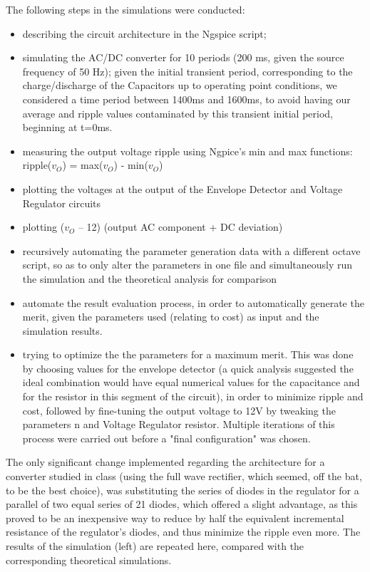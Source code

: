 The following steps in the simulations were conducted: 
\begin{itemize}
	\item describing the circuit architecture in the Ngspice script;
	\item simulating the AC/DC converter for 10 periods (200 ms, given the source frequency of 50 Hz); given the initial transient period, corresponding to the charge/discharge of the Capacitors up to operating point conditions, we considered a time period between 1400ms and 1600ms, to avoid having our average and ripple values contaminated by this transient initial period, beginning at t=0ms.
	\item measuring the output voltage ripple using Ngpice’s min and
max functions: ripple($v_O$) = max($v_O$) - min($v_O$)
	\item plotting the voltages at the output of the Envelope Detector
and Voltage Regulator circuits
	\item plotting ($v_O$ – 12) (output AC component + DC deviation)
	\item recursively automating the parameter generation data with a different octave script, so as to only alter the parameters in one file and simultaneously run the simulation and the theoretical analysis for comparison
	\item automate the result evaluation process, in order to automatically generate the merit, given the parameters used (relating to cost) as input and the simulation results.
	\item trying to optimize the the parameters for a maximum merit. This was done by choosing values for the envelope detector (a quick analysis suggested the ideal combination would have equal numerical values for the capacitance and for the resistor in this segment of the circuit), in order to minimize ripple and cost, followed by fine-tuning the output voltage to 12V by tweaking the parameters n and Voltage Regulator resistor. Multiple iterations of this process were carried out before a "final configuration" was chosen.
	

\end{itemize}

The only significant change implemented regarding the architecture for a converter studied in class (using the full wave rectifier, which seemed, off the bat, to be the best choice), was substituting the series of diodes in the regulator for a parallel of two equal series of 21 diodes, which offered a slight advantage, as this proved to be an inexpensive way to reduce by half the equivalent incremental resistance of the regulator's diodes, and thus minimize the ripple even more. The results of the simulation (left) are repeated here, compared with the corresponding theoretical simulations.
 
